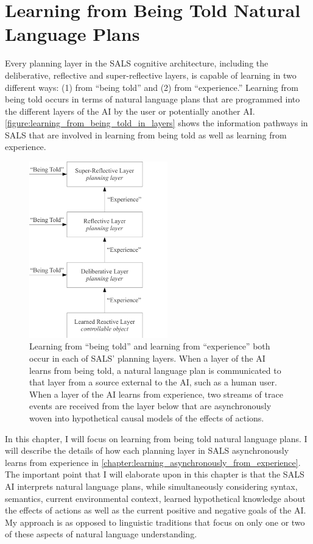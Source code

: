 \chapter{Learning from Being Told Natural Language Plans}
\label{chapter:learning_from_being_told_natural_language_plans}

Every planning layer in the SALS cognitive architecture, including the
deliberative, reflective and super-reflective layers, is capable of
learning in two different ways: (1) from ``being told'' and (2) from
``experience.''  Learning from being told occurs in terms of natural
language plans that are programmed into the different layers of the AI
by the user or potentially another AI.
{\mbox{\autoref{figure:learning_from_being_told_in_layers}}} shows the
information pathways in SALS that are involved in learning from being
told as well as learning from experience.
\begin{figure}
\centering
\includegraphics[width=6cm]{gfx/learning_from_being_told_in_layers}
\caption[Learning from ``being told'' and learning from ``experience''
  both occur in each of SALS' planning layers.]{Learning from ``being
  told'' and learning from ``experience'' both occur in each of SALS'
  planning layers.  When a layer of the AI learns from being told, a
  natural language plan is communicated to that layer from a source
  external to the AI, such as a human user.  When a layer of the AI
  learns from experience, two streams of trace events are received
  from the layer below that are asynchronously woven into hypothetical
  causal models of the effects of actions.}
\label{figure:learning_from_being_told_in_layers}
\end{figure}
In this chapter, I will focus on learning from being told natural
language plans.  I will describe the details of how each planning
layer in SALS asynchronously learns from experience in
{\mbox{\autoref{chapter:learning_asynchronously_from_experience}}}.
The important point that I will elaborate upon in this chapter is that
the SALS AI interprets natural language plans, while simultaneously
considering syntax, semantics, current environmental context, learned
hypothetical knowledge about the effects of actions as well as the
current positive and negative goals of the AI.  My approach is as
opposed to linguistic traditions that focus on only one or two of
these aspects of natural language understanding.

